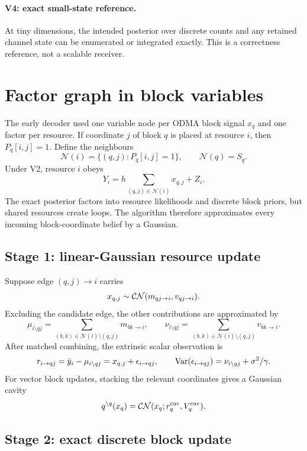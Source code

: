 \documentclass[11pt]{article}
\begin{document}
\paragraph{V4: exact small-state reference.}
At tiny dimensions, the intended posterior over discrete counts and any retained channel state can be enumerated or
integrated exactly. This is a correctness reference, not a scalable receiver.

\section{Factor graph in block variables}

The early decoder used one variable node per ODMA block signal $x_q$ and one factor per resource. If coordinate $j$ of
block $q$ is placed at resource $i$, then $P_q[i,j]=1$. Define the neighbours
\[
 \mathcal N(i)=\{(q,j):P_q[i,j]=1\},\qquad
 \mathcal N(q)=S_q.
\]
Under V2, resource $i$ obeys
\[
 Y_i=h\sum_{(q,j)\in\mathcal N(i)}x_{q,j}+Z_i.
\]
The exact posterior factors into resource likelihoods and discrete block priors, but shared resources create loops.
The algorithm therefore approximates every incoming block-coordinate belief by a Gaussian.

\subsection{Stage 1: linear-Gaussian resource update}

Suppose edge $(q,j)\to i$ carries
\[
 x_{q,j}\sim\mathcal{CN}(m_{qj\to i},v_{qj\to i}).
\]
Excluding the candidate edge, the other contributions are approximated by
\[
 \mu_{i\setminus qj}=\sum_{(b,k)\in\mathcal N(i)\setminus(q,j)}m_{bk\to i},
 \qquad
 \nu_{i\setminus qj}=\sum_{(b,k)\in\mathcal N(i)\setminus(q,j)}v_{bk\to i}.
\]
After matched combining, the extrinsic scalar observation is
\[
 r_{i\to qj}=\bar y_i-\mu_{i\setminus qj}=x_{q,j}+\epsilon_{i\to qj},
 \qquad
 \operatorname{Var}(\epsilon_{i\to qj})=\nu_{i\setminus qj}+\sigma^2/\gamma.
\]
For vector block updates, stacking the relevant coordinates gives a Gaussian cavity
\[
 q^{\setminus q}(x_q)=\mathcal{CN}(x_q;r_q^{\rm cav},V_q^{\rm cav}).
\]

\subsection{Stage 2: exact discrete block update}
\end{document}
